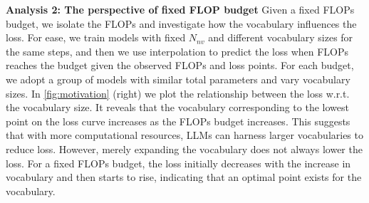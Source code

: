 \textbf{Analysis 2: The perspective of fixed FLOP budget}\;\;\;\;
Given a fixed FLOPs budget, we isolate the FLOPs and investigate how the vocabulary influences the loss. For ease, we train models with fixed $N_{nv}$ and different vocabulary sizes for the same steps, and then we use interpolation to predict the loss when FLOPs reaches the budget given the observed FLOPs and loss points. For each budget, we adopt a group of models with similar total parameters and vary vocabulary sizes. In \autoref{fig:motivation} (right) we plot the relationship between the loss w.r.t. the vocabulary size. It reveals that the vocabulary corresponding to the lowest point on the loss curve increases as the FLOPs budget increases. This suggests that with more computational resources, LLMs can harness larger vocabularies to reduce loss. However, merely expanding the vocabulary does not always lower the loss. For a fixed FLOPs budget, the loss initially decreases with the increase in vocabulary and then starts to rise, indicating that an optimal point exists for the vocabulary.

